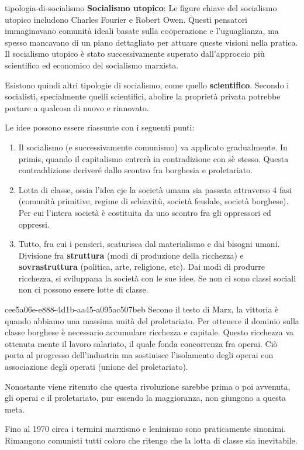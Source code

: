 \documentclass[preview]{standalone}
\begin{document}
\begin{snippet}{tipologia-di-socialismo}
    \textbf{Socialismo utopico}: Le figure chiave del socialismo utopico includono Charles Fourier e Robert Owen.
    Questi pensatori immaginavano comunità ideali basate sulla cooperazione e l'uguaglianza,
    ma spesso mancavano di un piano dettagliato per attuare queste visioni nella pratica.
    Il socialismo utopico è stato successivamente superato dall'approccio più scientifico
    ed economico del socialismo marxista.

    Esistono quindi altri tipologie di socialismo, come quello \textbf{scientifico}.
    Secondo i socialisti, specialmente quelli scientifici, abolire la proprietà privata
    potrebbe portare a qualcosa di nuovo e rinnovato.

    Le idee possono essere riassunte con i seguenti punti:
    \begin{enumerate}
        \item Il socialismo (e successivamente comunismo) va applicato gradualmente. In primis, quando il capitalismo entrerà in contradizione con sè stesso.
        Questa contraddizione deriveré dallo scontro fra borghesia e proletariato.
        \item Lotta di classe, ossia l'idea cje la società umana sia passata attraverso 4 fasi
        (comunità primitive, regime di schiavitù, società feudale, società borghese).
        Per cui l'intera società è costituita da uno scontro fra gli oppressori ed oppressi.
        \item Tutto, fra cui i pensieri, scaturisca dal materialismo e dai bisogni umani.
        Divisione fra \textbf{struttura} (modi di produzione della ricchezza)
        e \textbf{sovrastruttura} (politica, arte, religione, etc).
        Dai modi di produrre ricchezza, si sviluppana la società con le sue idee.
        Se non ci sono classi sociali non ci possono essere lotte di classe.
    \end{enumerate}
\end{snippet}


\begin{snippet}{cee5a06e-e888-4d1b-aa45-a095ac507beb}
    Secono il testo di Marx, la vittoria è quando abbiamo una massima unità del proletariato.
    Per ottenere il dominio sulla classe borghese è necessario accumulare ricchezza e capitale.
    Questo ricchezza va ottenuta mente il lavoro salariato, il quale fonda concorrenza fra operai.
    Ciò porta al progresso dell'industria ma sostiuisce l'isolamento degli operai con associazione degli operati (unione del proletariato).

    Nonostante viene ritenuto che questa rivoluzione sarebbe prima o poi avvenuta, gli operai e il proletariato,
    pur essendo la maggioranza, non giungono a questa meta.

    Fino al 1970 circa i termini marxismo e leninismo sono praticamente sinonimi.
    Rimangono comunisti tutti coloro che ritengo che la lotta di classe sia inevitabile.
\end{snippet}
\end{document}
